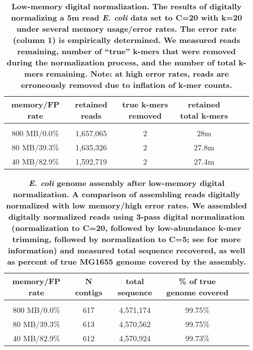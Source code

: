 \documentclass[10pt]{article}
\begin{document}

\begin{table}[!ht]
\caption{
\bf{Low-memory digital normalization. The results of digitally
  normalizing a 5m read {\em E. coli} data set to C=20 with k=20 under
  several memory usage/error rates.  The error rate
  (column 1) is empirically determined.  We measured reads remaining,
  number of ``true'' k-mers that were removed during the normalization
  process, and the number of total k-mers remaining.  Note: at high
  error rates, reads are erroneously removed due to inflation
  of k-mer counts.}}
\begin{tabular}{ | c | c | c | c | c | c |}
memory/FP rate & retained reads & true k-mers removed & retained total k-mers \\
\hline \\
 800 MB/0.0\% & 1,657,065 & 2 &   28m \\
 80 MB/39.3\% & 1,635,326 & 2 & 27.8m \\
 40 MB/82.9\% & 1,592,719 & 2 & 27.4m \\
\end{tabular}
\begin{flushleft}
\end{flushleft}
\label{table:loop_norm}
\end{table}


\begin{table}[!ht]
\caption{
\bf{{\em E. coli} genome assembly after low-memory digital normalization.
  A comparison of assembling reads digitally normalized with low memory/high
  error rates.  We assembled digitally normalized reads using
  3-pass digital normalization (normalization to C=20, followed by
  low-abundance k-mer trimming, followed by normalization to C=5; see
  \cite{Brown2012} for more information) and measured total sequence recovered,
  as well as percent of true MG1655 genome covered by the assembly.}}
\begin{tabular}{ | c | c | c | c | c | c |}
memory/FP rate & N contigs & total sequence & \% of true genome covered \\
\hline \\
      800 MB/0.0\% & 617 & 4,571,174 & 99.75\% \\
      80 MB/39.3\% & 613 & 4,570,562 & 99.75\% \\
      40 MB/82.9\% & 612 & 4,570,924 & 99.73\% \\
\end{tabular}
\begin{flushleft}
\end{flushleft}
\label{table:assembly}
\end{table}

\end{document}
